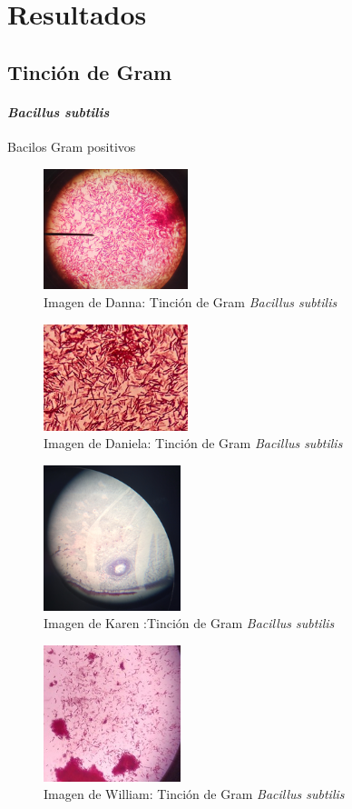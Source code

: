 \documentclass[journal,transmag]{IEEEtran}
\begin{document}
 
\section{Resultados} 

\subsection{\textbf{Tinción de Gram}} 


\paragraph{\large \textit{\textbf{Bacillus subtilis}}}Bacilos Gram positivos 
	\begin{figure}[!h] 
	\center 
	\includegraphics[width=4.2cm]{I1.png} 
	\caption{Imagen de Danna: Tinción de Gram \textit{Bacillus subtilis} } 
	\label{I1}
	\end{figure} 
	\begin{figure}[!h] 
	\center 
	\includegraphics[width=4.2cm]{I5.jpg} 
	\caption{Imagen de Daniela: Tinción de Gram \textit{Bacillus subtilis} } 
	\label{I1}
	\end{figure} 
	\begin{figure}[!h] 
	\center 
	\includegraphics[width=4cm]{I9.png} 
	\caption{Imagen de Karen :Tinción de Gram \textit{Bacillus subtilis} } 
	\label{I1}
	\end{figure} 
	\begin{figure}[!h] 
	\center 
	\includegraphics[width=4cm]{I13.jpg} 
	\caption{Imagen de William: Tinción de Gram \textit{Bacillus subtilis} } 
	\label{I1}
	\end{figure} 
\end{document}
